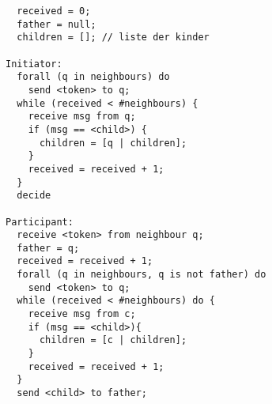 \begin{verbatim}
  received = 0;
  father = null;
  children = []; // liste der kinder

Initiator:
  forall (q in neighbours) do
    send <token> to q;
  while (received < #neighbours) {
    receive msg from q;
    if (msg == <child>) {
      children = [q | children];
    }
    received = received + 1;
  }
  decide

Participant:
  receive <token> from neighbour q;
  father = q;
  received = received + 1;
  forall (q in neighbours, q is not father) do
    send <token> to q;
  while (received < #neighbours) do {
    receive msg from c;
    if (msg == <child>){
      children = [c | children];
    }
    received = received + 1;
  }
  send <child> to father;
\end{verbatim}
